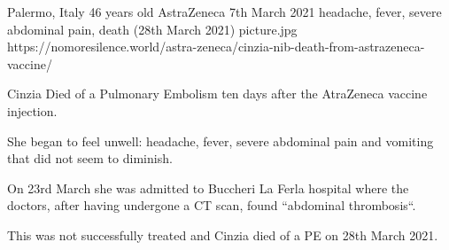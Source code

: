 {Palermo, Italy}
{46 years old}
{AstraZeneca}
{7th March 2021}
{headache, fever, severe abdominal pain, death (28th March 2021)}
{picture.jpg}
{https://nomoresilence.world/astra-zeneca/cinzia-nib-death-from-astrazeneca-vaccine/}
{

Cinzia Died of a Pulmonary Embolism ten days after the AtraZeneca vaccine injection.

She began to feel unwell: headache, fever, severe abdominal pain and vomiting
that did not seem to diminish.

On 23rd March she was admitted to Buccheri La Ferla hospital where the doctors,
after having undergone a CT scan, found “abdominal thrombosis“.

This was not successfully treated and Cinzia died of a PE on 28th March 2021.

}
